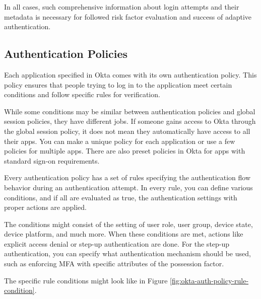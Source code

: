 In all cases, such comprehensive information about login attempts and their metadata is necessary for followed risk factor evaluation and success of adaptive authentication. 

\subsection*{Authentication Policies}
Each application specified in Okta comes with its own authentication policy.
This policy ensures that people trying to log in to the application meet certain conditions and follow specific rules for verification.

While some conditions may be similar between authentication policies and global session policies, they have different jobs. 
If someone gains access to Okta through the global session policy, it does not mean they automatically have access to all their apps.
You can make a unique policy for each application or use a few policies for multiple apps.
There are also preset policies in Okta for apps with standard sign-on requirements.

Every authentication policy has a set of rules specifying the authentication flow behavior during an authentication attempt.
In every rule, you can define various conditions, and if all are evaluated as true, the authentication settings with proper actions are applied.

\newpage

The conditions might consist of the setting of user role, user group, device state, device platform, and much more.
When these conditions are met, actions like explicit access denial or step-up authentication are done.
For the step-up authentication, you can specify what authentication mechanism should be used, such as enforcing MFA with specific attributes of the possession factor.

The specific rule conditions might look like in Figure \ref{fig:okta-auth-policy-rule-condition}.

